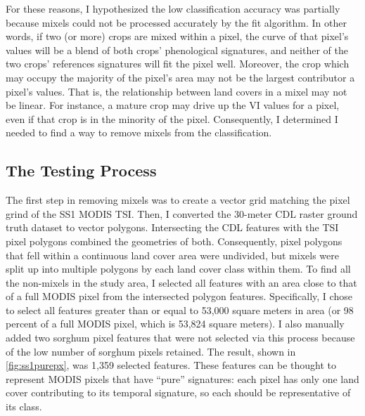 For these reasons, I hypothesized the low classification accuracy was partially because mixels could not be processed accurately by the fit algorithm. In other words, if two (or more) crops are mixed within a pixel, the curve of that pixel’s values will be a blend of both crops’ phenological signatures, and neither of the two crops' references signatures will fit the pixel well. Moreover, the crop which may occupy the majority of the pixel's area may not be the largest contributor a pixel’s values. That is, the relationship between land covers in a mixel may not be linear. For instance, a mature crop may drive up the VI values for a pixel, even if that crop is in the minority of the pixel. Consequently, I determined I needed to find a way to remove mixels from the classification.


\subsection*{The Testing Process}

The first step in removing mixels was to create a vector grid matching the pixel grind of the SS1 MODIS TSI. Then, I converted the 30-meter CDL raster ground truth dataset to vector polygons. Intersecting the CDL features with the TSI pixel polygons combined the geometries of both. Consequently, pixel polygons that fell within a continuous land cover area were undivided, but mixels were split up into multiple polygons by each land cover class within them. To find all the non-mixels in the study area, I selected all features with an area close to that of a full MODIS pixel from the intersected polygon features. Specifically, I chose to select all features greater than or equal to 53,000 square meters in area (or 98 percent of a full MODIS pixel, which is 53,824 square meters). I also manually added two sorghum pixel features that were not selected via this process because of the low number of sorghum pixels retained. The result, shown in \autoref{fig:ss1purepx}, was 1,359 selected features. These features can be thought to represent MODIS pixels that have ``pure'' signatures: each pixel has only one land cover contributing to its temporal signature, so each should be representative of its class.

